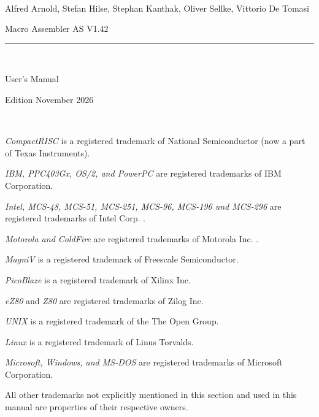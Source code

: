 \documentclass[12pt,twoside]{report}
\newcommand{\asname}{{AS}}
\begin{document}
\thispagestyle{empty}

\
\vspace{7cm}\par

\begin{raggedright}
{\large Alfred Arnold, Stefan Hilse, Stephan Kanthak, Oliver
 Sellke, Vittorio De Tomasi}
\vspace{1cm}\par
{\huge Macro Assembler \asname{} V1.42}\\
\rule{9.5cm}{0.3mm}\\
\vspace{2mm}\par
{\huge User's Manual}

\vspace{1cm}\par

{\large Edition November 2026}
\end{raggedright}

\clearpage
\thispagestyle{empty}

\ \vspace{5cm}

{\em CompactRISC} is a registered trademark of National
 Semiconductor (now a part of Texas Instruments).

{\em IBM, PPC403Gx, OS/2, and PowerPC} are registered trademarks of IBM
Corporation.

{\em Intel, MCS-48, MCS-51, MCS-251, MCS-96, MCS-196 und MCS-296} are
registered trademarks of Intel Corp. .

{\em Motorola and ColdFire} are registered trademarks of Motorola Inc. .

{\em MagniV} is a registered trademark of Freescale Semiconductor.

{\em PicoBlaze} is a registered trademark of Xilinx Inc.

{\em eZ80} and {\em Z80} are registered trademarks of Zilog Inc. 

{\em UNIX} is a registered trademark of the The Open Group.

{\em Linux} is a registered trademark of Linus Torvalds.

{\em Microsoft, Windows, and MS-DOS} are registered trademarks of
Microsoft Corporation.

All other trademarks not explicitly mentioned in this section and used in
this manual are properties of their respective owners.

\vspace{5cm}
\end{document}
